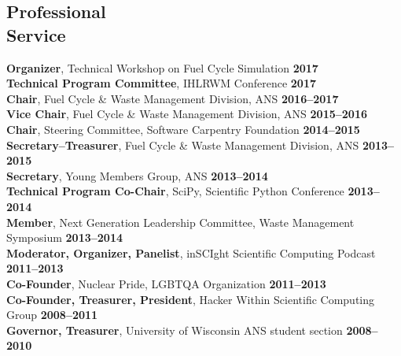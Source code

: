 \documentclass[margin,line]{resume}
\begin{document}
\begin{resume}
    \section{\mysidestyle Professional\\Service}
		\textbf{Organizer}, Technical Workshop on Fuel Cycle Simulation \hfill \textbf{2017}\vspace{.5mm}\\%
		\textbf{Technical Program Committee}, IHLRWM Conference \hfill \textbf{2017}\vspace{.5mm}\\%
		\textbf{Chair}, Fuel Cycle \& Waste Management Division, ANS  \hfill \textbf{2016--2017}\vspace{.5mm}\\%
		\textbf{Vice Chair}, Fuel Cycle \& Waste Management Division, ANS  \hfill \textbf{2015--2016}\vspace{.5mm}\\%
		\textbf{Chair}, Steering Committee, Software Carpentry Foundation   \hfill \textbf{2014--2015}\vspace{.5mm}\\%
		\textbf{Secretary--Treasurer}, Fuel Cycle \& Waste Management Division, ANS  \hfill \textbf{2013--2015}\vspace{.5mm}\\%
		\textbf{Secretary}, Young Members Group, ANS  \hfill \textbf{2013--2014}\vspace{.5mm}\\%
		\textbf{Technical Program Co-Chair}, SciPy, Scientific Python Conference   \hfill \textbf{2013--2014}\vspace{.5mm}\\%
		\textbf{Member}, Next Generation Leadership Committee, Waste Management Symposium  \hfill \textbf{2013--2014}\vspace{.5mm}\\%
		\textbf{Moderator, Organizer, Panelist}, inSCIght Scientific Computing Podcast  \hfill \textbf{2011--2013}\vspace{.5mm}\\%
		\textbf{Co-Founder}, Nuclear Pride, LGBTQA Organization  \hfill \textbf{2011--2013}\vspace{.5mm}\\%
		\textbf{Co-Founder, Treasurer, President}, Hacker Within Scientific Computing Group  \hfill \textbf{2008--2011}\vspace{.5mm}\\%
		\textbf{Governor, Treasurer}, University of Wisconsin ANS student section  \hfill \textbf{2008--2010}\vspace{.5mm}%

\end{resume}
\end{document}
